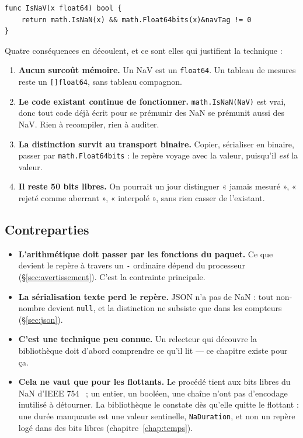 \documentclass[11pt,a4paper]{report}
\providecommand{\tightlist}{\setlength{\itemsep}{0pt}\setlength{\parskip}{0pt}}
\begin{document}
\begin{verbatim}
func IsNaV(x float64) bool {
    return math.IsNaN(x) && math.Float64bits(x)&navTag != 0
}
\end{verbatim}

Quatre conséquences en découlent, et ce sont elles qui justifient la
technique :

\begin{enumerate}
\def\labelenumi{\arabic{enumi}.}
\tightlist
\item
  \textbf{Aucun surcoût mémoire.} Un NaV est un \texttt{float64}. Un
  tableau de mesures reste un \texttt{[]float64}, sans tableau
  compagnon.
\item
  \textbf{Le code existant continue de fonctionner.}
  \texttt{math.IsNaN(NaV)} est vrai, donc tout code déjà écrit pour se
  prémunir des NaN se prémunit aussi des NaV. Rien à recompiler, rien à
  auditer.
\item
  \textbf{La distinction survit au transport binaire.} Copier,
  sérialiser en binaire, passer par \texttt{math.Float64bits} : le
  repère voyage avec la valeur, puisqu'il \emph{est} la valeur.
\item
  \textbf{Il reste 50 bits libres.} On pourrait un jour distinguer «
  jamais mesuré », « rejeté comme aberrant », « interpolé », sans rien
  casser de l'existant.
\end{enumerate}

\subsection{Contreparties}

\begin{itemize}
\tightlist
\item
  \textbf{L'arithmétique doit passer par les fonctions du paquet.} Ce
  que devient le repère à travers un \texttt{-} ordinaire dépend du
  processeur (\S\ref{sec:avertissement}). C'est la contrainte principale.
\item
  \textbf{La sérialisation texte perd le repère.} JSON n'a pas de NaN :
  tout non-nombre devient \texttt{null}, et la distinction ne subsiste
  que dans les compteurs (\S\ref{sec:json}).
\item
  \textbf{C'est une technique peu connue.} Un relecteur qui découvre la
  bibliothèque doit d'abord comprendre ce qu'il lit --- ce chapitre
  existe pour ça.
\item
  \textbf{Cela ne vaut que pour les flottants.} Le procédé tient aux bits
  libres du NaN d'IEEE 754~\cite{ieee754} ; un entier, un booléen, une
  chaîne n'ont pas d'encodage inutilisé à détourner. La bibliothèque le
  constate dès qu'elle quitte le flottant : une durée manquante est une
  valeur sentinelle, \texttt{NaDuration}, et non un repère logé dans des
  bits libres (chapitre~\ref{chap:temps}).
\end{itemize}
\end{document}
